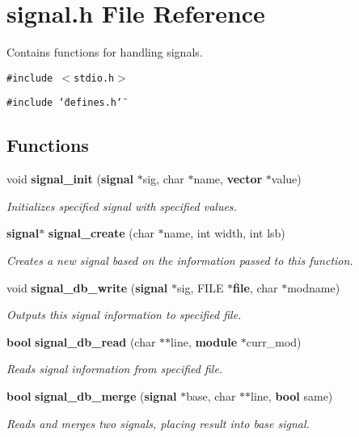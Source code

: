 \section{signal.h File Reference}
\label{signal_8h}
Contains functions for handling signals. 


{\tt \#include $<$stdio.h$>$}\par
{\tt \#include \char`\"{}defines.h\char`\"{}}\par
\subsection*{Functions}
\begin{CompactItemize}
\item 
void {\bf signal\_\-init} ({\bf signal} $\ast$sig, char $\ast$name, {\bf vector} $\ast$value)
\begin{CompactList}\small\item\em Initializes specified signal with specified values.\item\end{CompactList}\item 
{\bf signal}$\ast$ {\bf signal\_\-create} (char $\ast$name, int width, int lsb)
\begin{CompactList}\small\item\em Creates a new signal based on the information passed to this function.\item\end{CompactList}\item 
void {\bf signal\_\-db\_\-write} ({\bf signal} $\ast$sig, FILE $\ast${\bf file}, char $\ast$modname)
\begin{CompactList}\small\item\em Outputs this signal information to specified file.\item\end{CompactList}\item 
{\bf bool} {\bf signal\_\-db\_\-read} (char $\ast$$\ast$line, {\bf module} $\ast$curr\_\-mod)
\begin{CompactList}\small\item\em Reads signal information from specified file.\item\end{CompactList}\item 
{\bf bool} {\bf signal\_\-db\_\-merge} ({\bf signal} $\ast$base, char $\ast$$\ast$line, {\bf bool} same)
\begin{CompactList}\small\item\em Reads and merges two signals, placing result into base signal.\item\end{CompactList}\item 

\end{CompactItemize}
